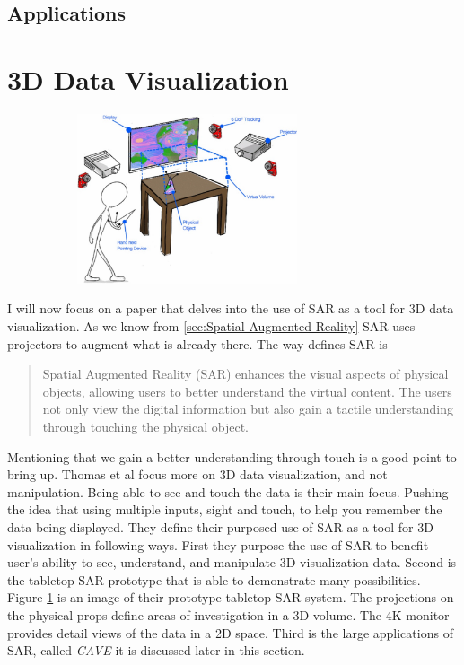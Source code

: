 \documentclass{sig-alternate}
\begin{document}
\subsection{Applications}
\label{Applications}



\section{3D Data Visualization}
\label{sec:3D Data Visualization}

\begin{figure}
	\includegraphics[width=8.5cm, height=5cm]{Tabletop}
	\caption{\cite{3D}}
	\label{fig:Tabletop}
\end{figure}

I will now focus on a paper that delves into the use of SAR as a tool for 3D data visualization. As we know from \ref{sec:Spatial Augmented Reality} SAR uses projectors to augment what is already there. The way \cite{3D} defines SAR is 
\begin{quote}
Spatial Augmented Reality (SAR) enhances the visual aspects of physical objects, allowing users to better understand the virtual content. The users not only view the digital information but also gain a tactile understanding through touching the physical object.
\end{quote}

Mentioning that we gain a better understanding through touch is a good point to bring up.
Thomas et al \cite{3D} focus more on 3D data visualization, and not manipulation. Being able to see and touch the data is their main focus. Pushing the idea that using multiple inputs, sight and touch, to help you remember the data being displayed. They \cite{3D} define their purposed use of SAR as a tool for 3D visualization in following ways. First they purpose the use of SAR to benefit user's ability to see, understand, and manipulate 3D visualization data. Second is the tabletop SAR prototype that is able to demonstrate many possibilities. Figure \ref{fig:Tabletop}  is an image of their prototype tabletop SAR system. The projections on the physical props define areas of investigation in a 3D volume. The 4K monitor provides detail views of the data in a 2D space. Third is the large applications of SAR, called \textit{CAVE} it is discussed later in this section.
\end{document}
